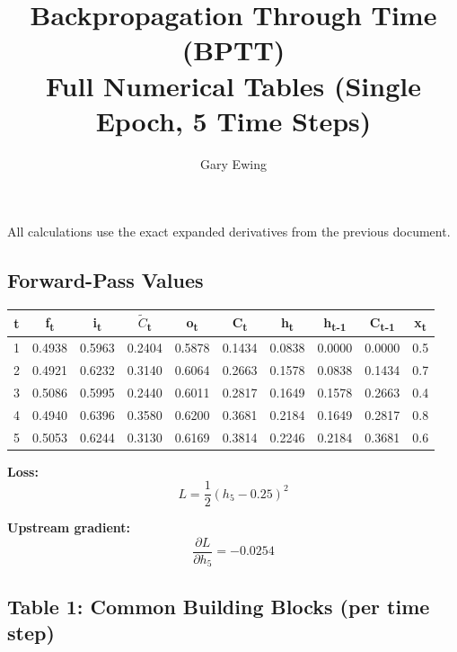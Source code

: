 \documentclass[12pt]{article}
\begin{document}
\title{Backpropagation Through Time (BPTT) \\ Full Numerical Tables (Single Epoch, 5 Time Steps)}
\author{Gary Ewing}
\date{}
\maketitle

All calculations use the exact expanded derivatives from the previous document.

\subsection*{Forward-Pass Values}

\begin{center}
\scriptsize
\begin{tabular}{cccccccccc}
\toprule
\textbf{t} & \textbf{f\textsubscript{t}} & \textbf{i\textsubscript{t}} & \textbf{$\tilde{C}$\textsubscript{t}} & \textbf{o\textsubscript{t}} & \textbf{C\textsubscript{t}} & \textbf{h\textsubscript{t}} & \textbf{h\textsubscript{t-1}} & \textbf{C\textsubscript{t-1}} & \textbf{x\textsubscript{t}} \\
\midrule
1 & 0.4938 & 0.5963 & 0.2404 & 0.5878 & 0.1434 & 0.0838 & 0.0000 & 0.0000 & 0.5 \\
2 & 0.4921 & 0.6232 & 0.3140 & 0.6064 & 0.2663 & 0.1578 & 0.0838 & 0.1434 & 0.7 \\
3 & 0.5086 & 0.5995 & 0.2440 & 0.6011 & 0.2817 & 0.1649 & 0.1578 & 0.2663 & 0.4 \\
4 & 0.4940 & 0.6396 & 0.3580 & 0.6200 & 0.3681 & 0.2184 & 0.1649 & 0.2817 & 0.8 \\
5 & 0.5053 & 0.6244 & 0.3130 & 0.6169 & 0.3814 & 0.2246 & 0.2184 & 0.3681 & 0.6 \\
\bottomrule
\end{tabular}
\end{center}

\textbf{Loss:}  
\[ L = \frac{1}{2}(h_5 - 0.25)^2 \]

\textbf{Upstream gradient:}  
\[ \frac{\partial L}{\partial h_5} = -0.0254 \]

\subsection*{Table 1: Common Building Blocks (per time step)}
\end{document}
